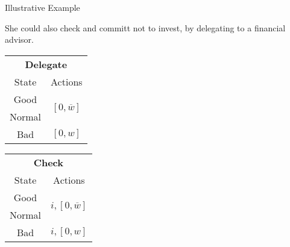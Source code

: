\documentclass[usenames,dvipsnames,aspectratio=169,11pt, envcountsect]{beamer}
\begin{document}
\begin{frame}{Illustrative Example}

	She could also check and committ not to invest, by delegating to a financial advisor.

	\vfill

	\begin{table}[H]
		\centering
		\begin{minipage}{0.29\textwidth}
			\centering
			\begin{tabular}{c | c}
				\multicolumn{2}{c}{\textbf{Delegate}}                                                                     \\
				State                        & Actions                                                                    \\
				\hline
				{\color{bleudefrance}Good}   & \multirow{2}{*}{{\color{bleudefrance}\( \left[0, \overline{w} \right] \)}} \\
				{\color{bleudefrance}Normal} &                                                                            \\
				Bad                          & \( \left[0, w \right]\)                                                    \\
			\end{tabular}
			\vspace{0.5cm} %
		\end{minipage}\hspace{0.5cm} %
		\begin{minipage}{0.29\textwidth}
			\centering
			\begin{tabular}{c | c}
				\multicolumn{2}{c}{\textbf{Check}}                                                                            \\
				State                        & Actions                                                                        \\
				\hline
				{\color{bleudefrance}Good}   & \multirow{2}{*}{{\color{bleudefrance}\( i, \left[ 0, \overline{w} \right] \)}} \\
				{\color{bleudefrance}Normal} &                                                                                \\
				Bad                          & \(  i, \left[0, w \right] \)                                                   \\

\end{tabular}
\end{minipage}
\end{table}
\end{frame}
\end{document}
